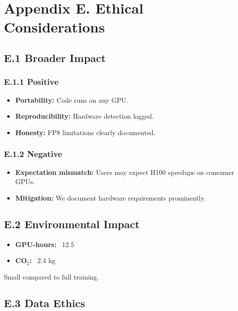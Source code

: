 \section{Appendix E. Ethical Considerations}

\subsection{E.1 Broader Impact}

\subsubsection{E.1.1 Positive}

\begin{itemize}
\item \textbf{Portability:} Code runs on any GPU.
\item \textbf{Reproducibility:} Hardware detection logged.
\item \textbf{Honesty:} FP8 limitations clearly documented.

\end{itemize}
\subsubsection{E.1.2 Negative}

\begin{itemize}
\item \textbf{Expectation mismatch:} Users may expect H100 speedups on consumer GPUs.
\item \textbf{Mitigation:} We document hardware requirements prominently.

\end{itemize}
\subsection{E.2 Environmental Impact}

\begin{itemize}
\item \textbf{GPU-hours:} ~12.5
\item \textbf{CO$_2$:} ~2.4 kg

\end{itemize}
Small compared to full training.

\subsection{E.3 Data Ethics}

